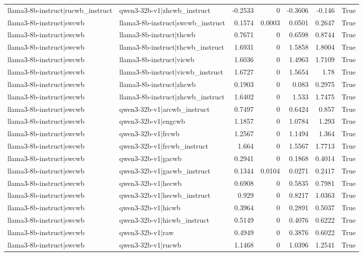 \begin{table}
\begin{tabular}{l l r r r r l}
llama3-8b-instruct|rucwb_instruct & qwen3-32b-v1|zhcwb_instruct & -0.2533 & 0 & -0.3606 & -0.146 & True \\
llama3-8b-instruct|swcwb & llama3-8b-instruct|swcwb_instruct & 0.1574 & 0.0003 & 0.0501 & 0.2647 & True \\
llama3-8b-instruct|swcwb & llama3-8b-instruct|thcwb & 0.7671 & 0 & 0.6598 & 0.8744 & True \\
llama3-8b-instruct|swcwb & llama3-8b-instruct|thcwb_instruct & 1.6931 & 0 & 1.5858 & 1.8004 & True \\
llama3-8b-instruct|swcwb & llama3-8b-instruct|vicwb & 1.6036 & 0 & 1.4963 & 1.7109 & True \\
llama3-8b-instruct|swcwb & llama3-8b-instruct|vicwb_instruct & 1.6727 & 0 & 1.5654 & 1.78 & True \\
llama3-8b-instruct|swcwb & llama3-8b-instruct|zhcwb & 0.1903 & 0 & 0.083 & 0.2975 & True \\
llama3-8b-instruct|swcwb & llama3-8b-instruct|zhcwb_instruct & 1.6402 & 0 & 1.533 & 1.7475 & True \\
llama3-8b-instruct|swcwb & qwen3-32b-v1|arcwb_instruct & 0.7497 & 0 & 0.6424 & 0.857 & True \\
llama3-8b-instruct|swcwb & qwen3-32b-v1|engcwb & 1.1857 & 0 & 1.0784 & 1.293 & True \\
llama3-8b-instruct|swcwb & qwen3-32b-v1|frcwb & 1.2567 & 0 & 1.1494 & 1.364 & True \\
llama3-8b-instruct|swcwb & qwen3-32b-v1|frcwb_instruct & 1.664 & 0 & 1.5567 & 1.7713 & True \\
llama3-8b-instruct|swcwb & qwen3-32b-v1|gacwb & 0.2941 & 0 & 0.1868 & 0.4014 & True \\
llama3-8b-instruct|swcwb & qwen3-32b-v1|gacwb_instruct & 0.1344 & 0.0104 & 0.0271 & 0.2417 & True \\
llama3-8b-instruct|swcwb & qwen3-32b-v1|hecwb & 0.6908 & 0 & 0.5835 & 0.7981 & True \\
llama3-8b-instruct|swcwb & qwen3-32b-v1|hecwb_instruct & 0.929 & 0 & 0.8217 & 1.0363 & True \\
llama3-8b-instruct|swcwb & qwen3-32b-v1|hicwb & 0.3964 & 0 & 0.2891 & 0.5037 & True \\
llama3-8b-instruct|swcwb & qwen3-32b-v1|hicwb_instruct & 0.5149 & 0 & 0.4076 & 0.6222 & True \\
llama3-8b-instruct|swcwb & qwen3-32b-v1|raw & 0.4949 & 0 & 0.3876 & 0.6022 & True \\
llama3-8b-instruct|swcwb & qwen3-32b-v1|rucwb & 1.1468 & 0 & 1.0396 & 1.2541 & True \\

\end{tabular}
\end{table}
